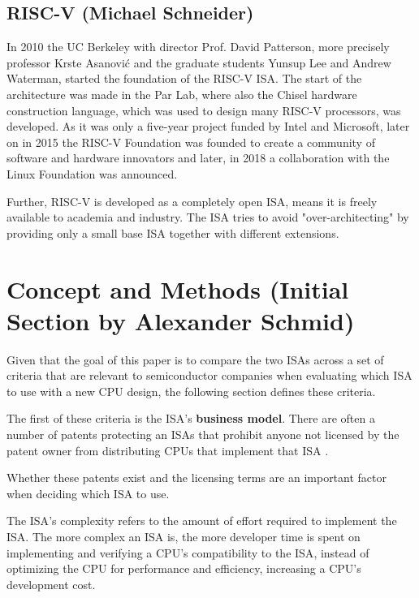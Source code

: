 \documentclass[conference]{IEEEtran}
\begin{document}
	\subsection{RISC-V (Michael Schneider)}
	In 2010 the UC Berkeley with director Prof. David Patterson, more precisely professor Krste Asanovi\'{c} and the graduate students Yunsup Lee and Andrew Waterman, started the foundation of the RISC-V \gls{ISA}. The start of the architecture was made in the \gls{Par Lab}, where also the Chisel hardware construction language, which was used to design many RISC-V processors, was developed. As it was only a five-year project funded by Intel and Microsoft, later on in 2015 the RISC-V Foundation was founded to create a community of software and hardware innovators and later, in 2018 a collaboration with the Linux Foundation was announced. \cite{International2020}

	Further, RISC-V is developed as a completely open ISA, means it is freely available to academia and industry. The \gls{ISA} tries to avoid "over-architecting" by providing only a small base \gls{ISA} together with different extensions. \cite[page 1]{Waterman2017}
	
\section{Concept and Methods (Initial Section by Alexander Schmid)}
	\label{ref:concept}

Given that the goal of this paper is to compare the two \glspl{ISA}
across a set of criteria that are relevant to semiconductor companies when evaluating which \gls{ISA} to use with a new CPU design,
the following section defines these criteria.

The first of these criteria is the \gls{ISA}'s \textbf{business model}. There are often a number of patents protecting an \glspl{ISA} that prohibit anyone not licensed
by the patent owner from distributing \glspl{CPU} that implement that \gls{ISA} \cite{Tang2011}.

Whether these patents exist and the licensing terms
are an important factor when deciding which \gls{ISA} to use.

The \gls{ISA}'s complexity refers to the amount of effort required to implement the \gls{ISA}. The more complex an \gls{ISA} is, the more developer
time is spent on implementing and verifying a \gls{CPU}'s compatibility to the \gls{ISA}, instead of optimizing the \gls{CPU} for performance and efficiency,
increasing a \gls{CPU}'s development cost. \cite{Patterson1980}
\end{document}
